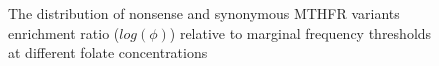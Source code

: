 \documentclass{article}
\begin{document}
\begin{figure}[H]%
    \centering
    \qquad
    \qquad
    \qquad
    \caption{The distribution of nonsense and synonymous MTHFR variants enrichment ratio ($log(\phi)$) relative to marginal frequency thresholds at different folate concentrations}%
    \label{fig:logphi bias MTHFR}%
\end{figure}
\end{document}
